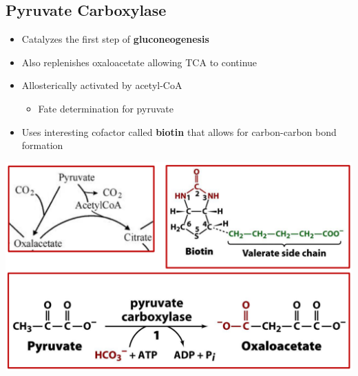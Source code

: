 \documentclass[10pt]{article}
\begin{document}
\subsection*{Pyruvate Carboxylase}
\begin{itemize}
	\item Catalyzes the first step of \textbf{gluconeogenesis}
	\item Also replenishes oxaloacetate allowing TCA to continue
	\item Allosterically activated by acetyl-CoA
	\begin{itemize}
        \item Fate determination for pyruvate
    \end{itemize}
	\item Uses interesting cofactor called \textbf{biotin} that allows for carbon-carbon bond formation
\end{itemize}
\begin{center} 
	\includegraphics*[width=\textwidth]{L1_3.png}
\end{center}

\pagebreak
\end{document}
